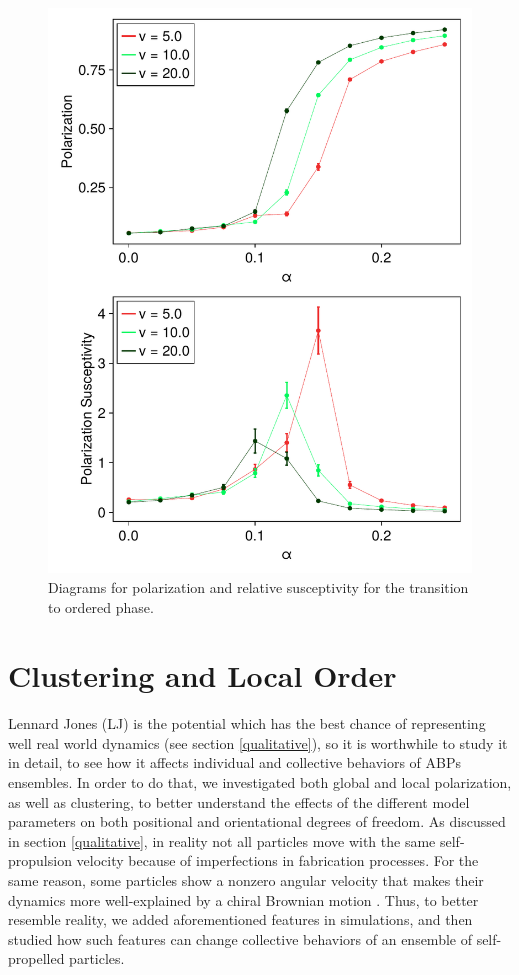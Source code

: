 \documentclass[../../master_thesis_np.tex]{subfiles}
\begin{document}
		\begin{figure}[htp]
			\centering
			\includegraphics[width= \singfigwidth]{phasetrans/pol_susc.pdf}
			\caption{Diagrams for polarization and relative susceptivity for the transition to ordered phase.}
			\label{fig:phasetrans}
		\end{figure}
		
		\section{Clustering and Local Order}
		Lennard Jones (LJ) is the potential which has the best chance of representing well real world dynamics (see section \ref{qualitative}), so it is worthwhile to study it in detail, to see how it affects individual and collective behaviors of ABPs ensembles. 
		In order to do that, we investigated both global and local polarization, as well as clustering, to better understand the effects of the different model parameters on both positional and orientational degrees of freedom.
		As discussed in section \ref{qualitative}, in reality not all particles move with the same self-propulsion velocity because of imperfections in fabrication processes.
		For the same reason, some particles show a nonzero angular velocity that makes their dynamics more well-explained by a chiral Brownian motion \cite{callegari_numerical_2019}.
		Thus, to better resemble reality, we added aforementioned features in simulations, and then studied how such features can change collective behaviors of an ensemble of self-propelled particles.
		
\end{document}
